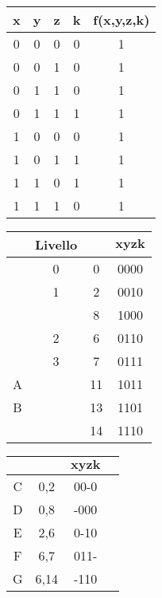 \documentclass{article}
\def\checkmark{\tikz\fill[scale=0.4](0,.35) -- (.25,0) -- (1,.7) -- (.25,.15) -- cycle;}
\begin{document}
\hspace*{-6em}
\begin{table}[!htb]
  \hspace{-8em}
  \begin{minipage}[t]{0.3\textwidth}
    \begin{tabular}{|c|c|c|c|c|}
      \hline
      \textbf{x} & \textbf{y} & \textbf{z} & \textbf{k} & \textbf{f(x,y,z,k)} \\
      \hline
        0 & 0 & 0 & 0 & 1 \\
      \hline
        0 & 0 & 1 & 0 & 1 \\
      \hline
        0 & 1 & 1 & 0 & 1 \\
      \hline
        0 & 1 & 1 & 1 & 1 \\
      \hline
        1 & 0 & 0 & 0 & 1 \\
      \hline
        1 & 0 & 1 & 1 & 1 \\
      \hline
        1 & 1 & 0 & 1 & 1 \\
      \hline
        1 & 1 & 1 & 0 & 1 \\
      \hline
    \end{tabular}
  \end{minipage}
  \hspace{5.4em}
  \begin{minipage}[t]{0.3\textwidth}
    \def\arraystretch{1.2}
    \begin{tabular}{|c|c|c|c|}
      \hline
      \phantom{\checkmark} & \textbf{Livello} & & \phantom{a}$\bm{xyzk}$\phantom{a} \\
      \hline
        & 0 & 0  & 0000 \\
      \hline
        & 1 & 2  & 0010 \\
        &   & 8  & 1000 \\
      \hline
        & 2 & 6  & 0110 \\
      \hline
        & 3 & 7  & 0111 \\
        A          &   & 11 & 1011 \\
        B          &   & 13 & 1101 \\
        &   & 14 & 1110 \\
      \hline
    \end{tabular}
  \end{minipage}
  \hspace{7em}
  \begin{minipage}[t]{0.3\textwidth}
    \begin{tabular}{|c|c|c|c|}
      \hline
      \quad\quad\quad & \quad\quad\quad\quad & \quad$\bm{xyzk}$\quad\quad \\
      \hline
        C & 0,2  & 00-0 \\
        D & 0,8  & -000 \\
      \hline
        E & 2,6  & 0-10 \\
      \hline
        F & 6,7  & 011- \\
        G & 6,14 & -110 \\
      \hline
    \end{tabular}
  \end{minipage}


\end{table}
\end{document}
